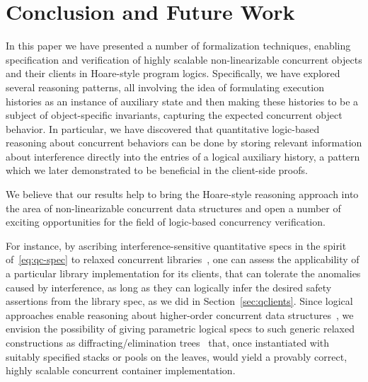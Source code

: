 
\section{Conclusion and Future Work}
\label{sec:conclusion}


In this paper we have presented a number of formalization techniques,
enabling specification and verification of highly scalable
non-linearizable concurrent objects and their clients in Hoare-style
program logics.
%
Specifically, we have explored several reasoning patterns, all
involving the idea of formulating execution histories as an instance
of auxiliary state and then making these histories to be a subject of
object-specific invariants, capturing the expected concurrent object
behavior.
%
In particular, we have discovered that quantitative logic-based
reasoning about concurrent behaviors can be done by storing relevant
information about interference directly into the entries of a logical
auxiliary history, a pattern which we later demonstrated to be
beneficial in the client-side proofs.

We believe that our results help to bring the Hoare-style reasoning
approach into the area of non-linearizable concurrent data structures
and open a number of exciting opportunities for the field of
logic-based concurrency verification.

For instance, by ascribing interference-sensitive quantitative specs
in the spirit of~\eqref{eq:qc-spec} to relaxed concurrent
libraries~\cite{Henzinger-al:POPL13}, one can assess the applicability
of a particular library implementation for its clients, that can
tolerate the anomalies caused by interference, as long as they can
logically infer the desired safety assertions from the library spec,
as we did in Section~\ref{sec:qclients}.
%
Since logical approaches enable reasoning about higher-order
concurrent data
structures~\cite{Svendsen-al:ESOP13,Turon-al:ICFP13,Sergey-al:ESOP15},
we envision the possibility of giving parametric logical specs to such
generic relaxed constructions as diffracting/elimination
trees~\cite{Shavit-Touitou:TCS97,Shavit:CACM11} that, once
instantiated with suitably specified stacks or pools on the leaves,
would yield a provably correct, highly scalable concurrent container
implementation.






